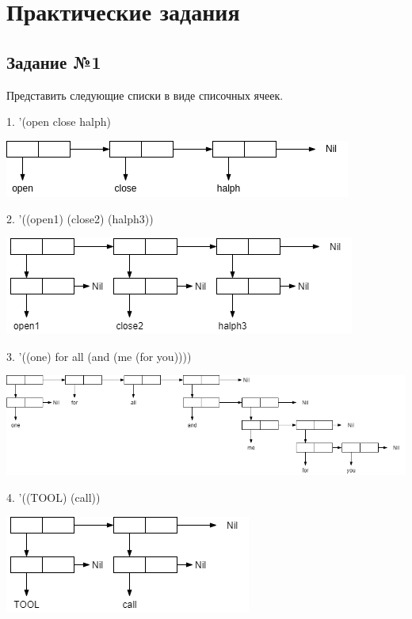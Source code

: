 \chapter{Практические задания}

\section{Задание №1}

Представить следующие списки в виде списочных ячеек.

1. '(open close halph)\newline


\includegraphics[scale=0.8]{img/1.1}

2. '((open1) (close2) (halph3))\newline

\includegraphics[scale=0.8]{img/1.2}

3. '((one) for all (and (me (for you))))\newline

\includegraphics[scale=0.55]{img/1.3}

4. '((TOOL) (call))\newline

\includegraphics[scale=0.8]{img/1.4}

